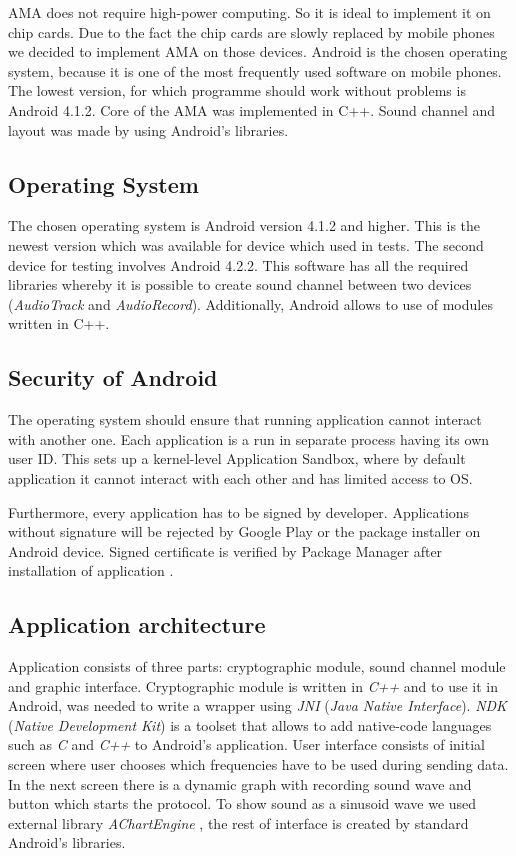\documentclass[11pt,titlepage]{article}
\theoremstyle{plain}
\begin{document}
AMA does not require high-power computing. So it is ideal to implement it on chip cards. Due to the fact the chip cards are slowly replaced by mobile phones we decided to implement AMA on those devices. Android is the chosen operating system, because it is one of the most frequently used software on mobile phones. The lowest version, for which programme should work without problems is Android 4.1.2. Core of the AMA was implemented in C++. Sound channel and layout was made by using Android's libraries. 

\subsection{Operating System}

The chosen operating system is Android version 4.1.2 and higher. This is the newest version which was available for device which used in tests. The second device for testing involves Android 4.2.2. This software has all the required libraries whereby it is possible to create sound channel between two devices (\textit{AudioTrack} and \textit{AudioRecord}). Additionally, Android allows to use of modules written in C++. 

\subsection{Security of Android}

The operating system should ensure that running application cannot interact with another one. Each application is a run in separate process having its own user ID. This sets up a kernel-level Application Sandbox, where by default application it cannot interact with each other and has limited access to OS.

\vspace{5mm}

Furthermore, every application has to be signed by developer. Applications without signature will be rejected by Google Play or the package installer on Android device. Signed certificate is verified by Package Manager after installation of application \cite{android_sec}.

\subsection{Application architecture}

Application consists of three parts: cryptographic module, sound channel module and graphic interface. Cryptographic module is written in \textit{C++} and to use it in Android, was needed to write a wrapper using \textit{JNI} (\textit{Java Native Interface}). \textit{NDK} (\textit{Native Development Kit}) is a toolset that allows to add native-code languages such as \textit{C} and \textit{C++} to Android's application. User interface consists of initial screen where user chooses which frequencies have to be used during sending data. In the next screen there is a dynamic graph with recording sound wave and button which starts the protocol. To show sound as a sinusoid wave we used external library \textit{AChartEngine} \cite{chart_eng}, the rest of interface is created by standard Android's libraries.
\end{document}
